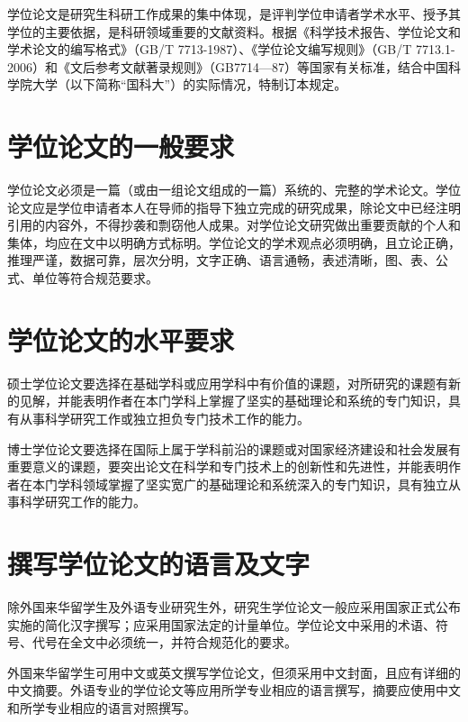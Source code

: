 
学位论文是研究生科研工作成果的集中体现，是评判学位申请者学术水平、授予其学位的主要依据，是科研领域重要的文献资料。根据《科学技术报告、学位论文和学术论文的编写格式》（GB/T 7713-1987）、《学位论文编写规则》（GB/T 7713.1-2006）和《文后参考文献著录规则》（GB7714—87）等国家有关标准，结合中国科学院大学（以下简称“国科大”）的实际情况，特制订本规定。

\section{学位论文的一般要求}

学位论文必须是一篇（或由一组论文组成的一篇）系统的、完整的学术论文。学位论文应是学位申请者本人在导师的指导下独立完成的研究成果，除论文中已经注明引用的内容外，不得抄袭和剽窃他人成果。对学位论文研究做出重要贡献的个人和集体，均应在文中以明确方式标明。学位论文的学术观点必须明确，且立论正确，推理严谨，数据可靠，层次分明，文字正确、语言通畅，表述清晰，图、表、公式、单位等符合规范要求。

\section{学位论文的水平要求}

硕士学位论文要选择在基础学科或应用学科中有价值的课题，对所研究的课题有新的见解，并能表明作者在本门学科上掌握了坚实的基础理论和系统的专门知识，具有从事科学研究工作或独立担负专门技术工作的能力。

博士学位论文要选择在国际上属于学科前沿的课题或对国家经济建设和社会发展有重要意义的课题，要突出论文在科学和专门技术上的创新性和先进性，并能表明作者在本门学科领域掌握了坚实宽广的基础理论和系统深入的专门知识，具有独立从事科学研究工作的能力。

\section{撰写学位论文的语言及文字}

除外国来华留学生及外语专业研究生外，研究生学位论文一般应采用国家正式公布实施的简化汉字撰写；应采用国家法定的计量单位。学位论文中采用的术语、符号、代号在全文中必须统一，并符合规范化的要求。

外国来华留学生可用中文或英文撰写学位论文，但须采用中文封面，且应有详细的中文摘要。外语专业的学位论文等应用所学专业相应的语言撰写，摘要应使用中文和所学专业相应的语言对照撰写。


